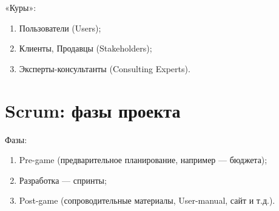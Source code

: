 \documentclass{article}
\begin{document}
    «Куры»:
    \begin{enumerate}
        \item Пользователи (Users);
        \item Клиенты, Продавцы (Stakeholders);
        \item Эксперты-консультанты (Consulting Experts).
    \end{enumerate}

\section{Scrum: фазы проекта}
    Фазы:
    \begin{enumerate}
        \item Pre-game (предварительное планирование, например — бюджета);
        \item Разработка — спринты;
        \item Post-game (сопроводительные материалы, User-manual, сайт и т.д.).
    \end{enumerate}
\end{document}
